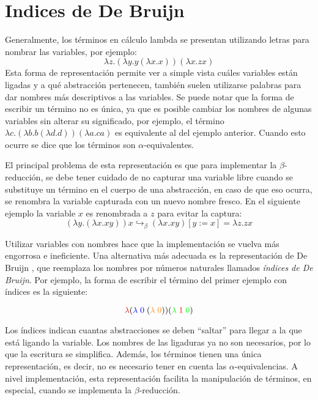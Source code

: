 \section{Indices de De Bruijn}
Generalmente, los términos en cálculo lambda se presentan utilizando letras para nombrar las variables, por ejemplo:
\[ \lambda z. (\lambda y. y (\lambda x. x)) (\lambda x. z x) \]
Esta forma de representación permite ver a simple vista cuáles variables están ligadas y a qué abstracción pertenecen, también suelen utilizarse palabras para dar nombres más descriptivos a las variables.
Se puede notar que la forma de escribir un término no es única, ya que es posible cambiar los nombres de algunas variables sin alterar su significado, por ejemplo, el término $\lambda c. (\lambda b. b (\lambda d. d)) (\lambda a. c a)$ es equivalente al del ejemplo anterior.
Cuando esto ocurre se dice que los términos son $\alpha$-equivalentes.

El principal problema de esta representación es que para implementar la $\beta$-reducción, se debe tener cuidado de no capturar una variable libre cuando se substituye un término en el cuerpo de una abstracción, en caso de que eso ocurra, se renombra la variable capturada con un nuevo nombre fresco.
En el siguiente ejemplo la variable $x$ es renombrada a $z$ para evitar la captura:
\[ (\lambda y. (\lambda x. x y)) x \hookrightarrow_{\beta} (\lambda x. x y)[y := x] = \lambda z. z x \]

Utilizar variables con nombres hace que la implementación se vuelva más engorrosa e ineficiente.
Una alternativa más adecuada es la representación de De Bruijn \cite{debrujin_index}, que reemplaza los nombres por números naturales llamados \textit{índices de De Bruijn}.
Por ejemplo, la forma de escribir el término del primer ejemplo con índices es la siguiente:

\[ \textcolor{red}{\lambda} (\textcolor{blue}{\lambda\; 0} \; (\textcolor{orange}{\lambda\; 0})) (\textcolor{green}{\lambda}\; \textcolor{red}{1} \; \textcolor{green}{0}) \]

Los índices indican cuantas abstracciones se deben ``saltar'' para llegar a la que está ligando la variable.
Los nombres de las ligaduras ya no son necesarios, por lo que la escritura se simplifica.
Además, los términos tienen una única representación, es decir, no es necesario tener en cuenta las $\alpha$-equivalencias.
A nivel implementación, esta representación facilita la manipulación de términos, en especial, cuando se implementa la $\beta$-reducción.

